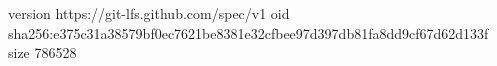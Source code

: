 version https://git-lfs.github.com/spec/v1
oid sha256:e375c31a38579bf0ec7621be8381e32cfbee97d397db81fa8dd9cf67d62d133f
size 786528
